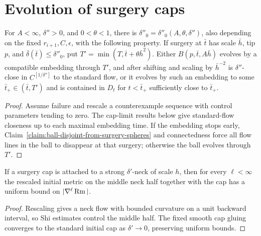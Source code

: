 \section{Evolution of surgery caps}

\begin{proposition}
\label{prop:surgery-cap-evolution-alternative}
\label{altern}
For $A<\infty$, $\delta''>0$, and $0<\theta<1$, there is $\delta''_0=\delta''_0(A,\theta,\delta'')$, also depending on the fixed $r_{i+1},C,\epsilon$, with the following property. If surgery at $\bar t$ has scale $\bar h$, tip $p$, and $\overline\delta(\bar t)\leq\delta''_0$, put $T'=\min(T,\bar t+\theta\bar h^2)$. Either $B(p,\bar t,A\bar h)$ evolves by a compatible embedding through $T'$, and after shifting and scaling by $\bar h^{-2}$ is $\delta''$-close in $C^{[1/\delta'']}$ to the standard flow, or it evolves by such an embedding to some $\bar t_+\in(\bar t,T')$ and is contained in $D_t$ for $t<\bar t_+$ sufficiently close to $\bar t_+$.
\end{proposition}
\begin{proof}
\sketch

Assume failure and rescale a counterexample sequence with control parameters tending to zero. The cap-limit results below give standard-flow closeness up to each maximal embedding time. If the embedding stops early, Claim~\ref{claim:ball-disjoint-from-surgery-spheres} and connectedness force all flow lines in the ball to disappear at that surgery; otherwise the ball evolves through $T'$.
\end{proof}

\begin{claim}
\label{claim:surgery-cap-curvature-bound-uniform}
If a surgery cap is attached to a strong $\delta'$-neck of scale $h$, then for every $\ell<\infty$ the rescaled initial metric on the middle neck half together with the cap has a uniform bound on $|\nabla^\ell\operatorname{Rm}|$.
\end{claim}
\begin{proof}
\sketch
{}
Rescaling gives a neck flow with bounded curvature on a unit backward interval, so Shi estimates control the middle half. The fixed smooth cap gluing converges to the standard initial cap as $\delta'\to0$, preserving uniform bounds.
\end{proof}

